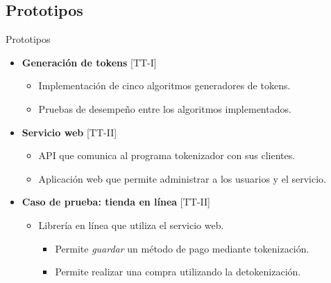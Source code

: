 %
%
%

\subsection{Prototipos}

\begin{frame}{Prototipos}

  \begin{itemize}
    \item \textbf{Generación de tokens} [TT-I]
      \begin{itemize}
        \item Implementación de cinco algoritmos generadores de tokens.
        \item Pruebas de desempeño entre los algoritmos implementados.
      \end{itemize}
    \item \textbf{Servicio web} [TT-II]
      \begin{itemize}
        \item API que comunica al programa tokenizador con sus clientes.
        \item Aplicación web que permite administrar a los usuarios y el
          servicio.
      \end{itemize}
    \item \textbf{Caso de prueba: tienda en línea} [TT-II]
      \begin{itemize}
        \item Librería en línea que utiliza el servicio web.
        \begin{itemize}
          \item Permite \emph{guardar} un método de pago mediante tokenización.
          \item Permite realizar una compra utilizando la detokenización.
        \end{itemize}
      \end{itemize}
  \end{itemize}


\end{frame}
